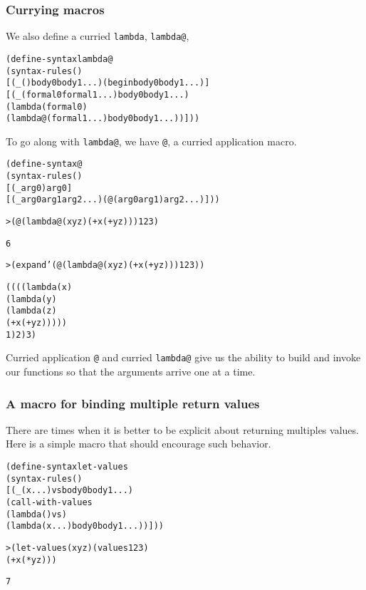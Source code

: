 \subsubsection{Currying macros}

We also define a curried \texttt{lambda}, \texttt{lambda@},

\begin{alltt}
(define-syntax lambda@
  (syntax-rules ()
    [(_ () body0 body1 ...) (begin body0 body1 ...)]
    [(_ (formal0 formal1 ...) body0 body1 ...)
     (lambda (formal0)
       (lambda@ (formal1 ...) body0 body1 ...))]))
\end{alltt}

To go along with \texttt{lambda@}, we have \texttt{@}, a curried
application macro.

\begin{alltt}
(define-syntax @    
  (syntax-rules ()
    [(_ arg0) arg0]
    [(_ arg0 arg1 arg2 ...) (@ (arg0 arg1) arg2 ...)]))
\end{alltt}

\begin{alltt}
> (@ (lambda@ (x y z) (+ x (+ y z))) 1 2 3)

6

> (expand '(@ (lambda@ (x y z) (+ x (+ y z))) 1 2 3))

((((lambda (x)
     (lambda (y)
       (lambda (z)
         (+ x (+ y z)))))
   1) 2) 3)
\end{alltt}

Curried application \texttt{@} and curried \texttt{lambda@} give us
the ability to build and invoke our functions so that the arguments
arrive one at a time.

\subsubsection{A macro for binding multiple return values}

There are times when it is better to be explicit about returning
multiples values.  Here is a simple macro that should encourage
such behavior.

\begin{alltt}
(define-syntax let-values
  (syntax-rules ()
    [(_ (x ...) vs body0 body1 ...)
     (call-with-values 
       (lambda () vs)
       (lambda (x ...) body0 body1 ...))]))

> (let-values (x y z) (values 1 2 3) 
    (+ x (* y z)))

7
\end{alltt}

